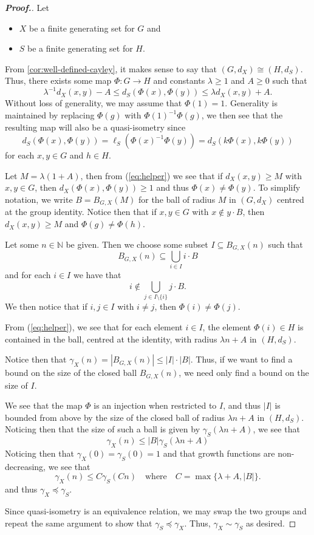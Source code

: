 \documentclass[11pt,a4paper,reqno]{amsart}
\theoremstyle{plain}
\theoremstyle{definition}
\theoremstyle{definition}
\renewcommand\leq\leqslant
\renewcommand\geq\geqslant
\newenvironment{myproof}{\begin{proof}[\normalfont\bfseries Proof.]}{\end{proof}}
\begin{document}
\begin{myproof}
Let
\begin{itemize}
	\item $X$ be a finite generating set for $G$ and
	\item $S$ be a finite generating set for $H$.
\end{itemize}
From \cref{cor:well-defined-cayley}, it makes sense to say that $(G,d_X)\cong (H,d_S)$.
Thus, there exists some map $\Phi\colon G\to H$ and constants $\lambda\geq 1$ and $A \geq 0$ such that
\begin{equation}\label{eq:helper}
	\lambda^{-1} d_X(x,y) - A
	\leq
	d_S(\Phi(x),\Phi(y))
	\leq
	\lambda d_X(x,y) + A.
\end{equation}
Without loss of generality, we may assume that $\Phi(1)=1$.
Generality is maintained by replacing $\Phi(g)$ with $\Phi(1)^{-1}\Phi(g)$, we then see that the resulting map will also be a quasi-isometry since
\[
	d_S(\Phi(x),\Phi(y)) = \ell_S(\Phi(x)^{-1}\Phi(y)) = d_S(k\Phi(x),k\Phi(y))
\]
for each $x,y\in G$ and $h\in H$.

Let $M = \lambda (1+A)$, then from (\ref{eq:helper}) we see that if $d_X(x,y) \geq M$ with $x,y\in G$, then $d_X(\Phi(x),\Phi(y)) \geq 1$ and thus $\Phi(x)\neq \Phi(y)$.
To simplify notation, we write $B = B_{G,X}(M)$ for the ball of radius $M$ in $(G,d_X)$ centred at the group identity.
Notice then that if $x,y\in G$ with $x\notin y\cdot B$, then $d_X(x,y) \geq M$ and $\Phi(g)\neq \Phi(h)$.

Let some $n\in \mathbb{N}$ be given.
Then we choose some subset $I \subseteq B_{G,X}(n)$ such that
\[
	B_{G,X}(n)
	\subseteq
	\bigcup_{i\in I}
	i\cdot B
\]
and for each $i\in I$ we have that
\[
	i \notin \bigcup_{j\in I\setminus\{i\}}
	j\cdot B.
\]
We then notice that if $i,j\in I$ with $i\neq j$, then $\Phi(i)\neq \Phi(j)$.

From (\ref{eq:helper}), we see that for each element $i\in I$, the element $\Phi(i) \in H$ is contained in the ball, centred at the identity, with radius $\lambda n+A$ in $(H,d_S)$.

Notice then that $\gamma_X(n)=|B_{G,X}(n)| \leq |I|\cdot|B|$.
Thus, if we want to find a bound on the size of the closed ball $B_{G,X}(n)$, we need only find a bound on the size of $I$.

We see that the map $\Phi$ is an injection when restricted to $I$, and thus $|I|$ is bounded from above by the size of the closed ball of radius $\lambda n+A$ in $(H,d_S)$.
Noticing then that the size of such a ball is given by $\gamma_S(\lambda n+A)$, we see that
\[
	\gamma_X(n)
	\leq 
	|B| \gamma_S(\lambda n + A)
\]
Noticing then that $\gamma_X(0)=\gamma_S(0)=1$ and that growth functions are non-decreasing, we see that
\[
	\gamma_X(n)
	\leq 
	C\gamma_S(C n)
\quad\text{where}\quad
	C =
	\max\{\lambda + A,|B|\}.
\]
and thus $\gamma_X\preccurlyeq \gamma_S$.

Since quasi-isometry is an equivalence relation, we may swap the two groups and repeat the same argument to show that $\gamma_S\preccurlyeq \gamma_X$. Thus, $\gamma_X\sim \gamma_S$ as desired.
\end{myproof}
\end{document}

